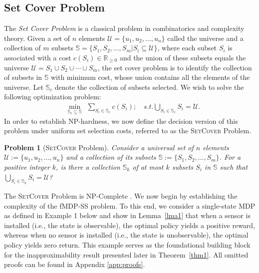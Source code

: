 \documentclass[twocolumn]{autart}    %
\newtheorem{problem}{Problem}
\begin{document}
\subsection{Set Cover Problem}
The \textit{Set Cover Problem} is a classical problem in combinatorics and complexity theory. Given a set of $n$ elements $\mathcal{U} = \{u_1,u_2, \hdots, u_n \}$ called the universe and a collection of $m$ subsets $\mathbb{S} = \{ S_1, S_2, \hdots, S_m | S_i \subseteq \mathcal{U}\}$, where each subset $S_i$ is associated with a cost $c(S_i) \in \mathbb{R}_{\geq 0}$ and  the union of these subsets equals the universe $\mathcal{U} = S_1 \cup S_2 \cup \cdots \cup S_m$, the set cover problem is to identify the collection of subsets in $\mathbb{S}$ with minimum cost, whose union contains all the elements of the universe. Let $\mathbb{S}_c$ denote the collection of subsets selected.  We wish to solve the following optimization problem:
\begin{align*}
& \hspace{1pt}  \min_{\mathbb{S}_c \subseteq \mathbb{S}} \hspace{5pt}  \sum_{S_i \in \mathbb{S}_c} c(S_i) ; \quad \textit{s.t.}  \hspace{0pt} \bigcup_{S_i \in \mathbb{S}_c} S_i = \mathcal{U}.
\end{align*}
In order to establish NP-hardness, we now define the decision version of this problem under uniform set selection costs, referred to as the \textsc{SetCover} Problem.
\\
\begin{problem}[\textsc{SetCover} Problem]
     Consider a universal set of $n$ elements $\mathcal{U}:= \{ u_1, u_2, \hdots, u_n \}$ and a collection of its subsets $\mathbb{S}:= \{ S_1, S_2, \hdots, S_m \}$. For a positive integer $k$, is there a collection $\mathbb{S}_k$ of at most $k$ subsets $S_i$ in $\mathbb{S}$ such that $\bigcup_{S_i \in \mathbb{S}_k} S_i = \mathcal{U}$?
 \end{problem} \vspace{3pt}
The \textsc{SetCover} Problem is NP-Complete \cite{karp2010reducibility}. {We now begin by establishing the complexity of the fMDP-SS problem. To this end, we consider a single-state MDP as defined in Example 1 below and show in Lemma~\ref{lma1} that when a sensor is installed (i.e., the state is observable), the optimal policy yields a positive reward, whereas when no sensor is installed (i.e., the state is unobservable), the optimal policy yields zero return. This example serves as the foundational building block for the inapproximability result presented later in Theorem~\ref{thm1}. All omitted proofs can be found in Appendix \ref{app:proofs}.}
\end{document}
